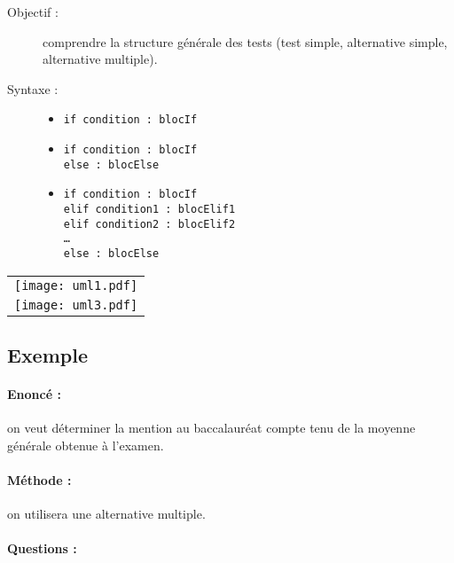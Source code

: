 \noindent\begin{minipage}{7cm}
\begin{description}
\item[Objectif :] comprendre la structure générale des tests (test simple, alternative simple, alternative multiple).
\item[Syntaxe \python :] \mbox{}
\begin{itemize}
\item \texttt{if condition : blocIf}
\item \texttt{if condition : blocIf}\\\texttt{else : blocElse}
\item \texttt{if condition : blocIf}\\\texttt{elif condition1 : blocElif1}\\\texttt{elif condition2 : blocElif2}\\\texttt{\ldots}\\\texttt{else : blocElse}
\end{itemize}
\end{description}
\end{minipage}
\mbox{}\hfill
\begin{tabular}{c}
\texttt{[image: uml1.pdf]}\\[3mm]
\texttt{[image: uml3.pdf]}
\end{tabular}

\subsection{Exemple}

\paragraph{Enoncé :} on veut déterminer la mention au baccalauréat compte tenu
de la moyenne générale obtenue à l'examen.

\paragraph{Méthode :} on utilisera une alternative multiple.

\paragraph{Questions :} \mbox{}

